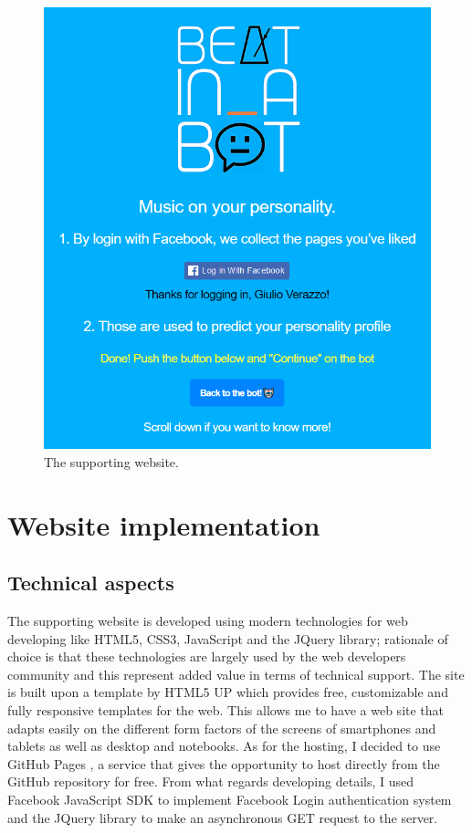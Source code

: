 \documentclass[b5paper,10pt,twoside,cucitura]{toptesi}
\begin{document}
\begin{figure}[ht]
\centering
\includegraphics[scale=0.55]{website1.png}
\caption{The supporting website.}
\end{figure}


\section{Website implementation}

\subsection{Technical aspects}
The supporting website is developed using modern technologies for web developing like HTML5, CSS3, JavaScript and the JQuery library; rationale of choice is that these technologies are largely used by the web developers community and this represent added value in terms of technical support. The site is built upon a template by HTML5 UP  \citep{html5up} which provides free, customizable and fully responsive templates for the web. This allows me to have a web site that adapts easily on the different form factors of the screens of smartphones and tablets as well as desktop and notebooks. As for the hosting, I decided to use GitHub Pages   \citep{githubpages}, a service that gives the opportunity to host directly from the GitHub repository for free. From what regards developing details, I used Facebook JavaScript SDK to implement Facebook Login authentication system and the JQuery library to make an asynchronous GET request to the server. 
\end{document}
